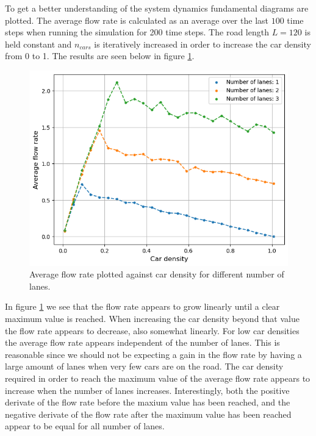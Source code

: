 \documentclass[a4paper,12pt]{article}
\begin{document}
To get a better understanding of the system dynamics fundamental diagrams are plotted. The average flow rate is calculated as an average over the last $100$ time steps when running
the simulation for 200 time steps. The road length $L=120$ is held constant and $n_{cars}$ is iteratively
increased in order to increase the car density from 0 to 1. The results are seen below in figure \ref*{fundamental diagram}.

\begin{figure}[H]
    \centering
    \includegraphics[scale=0.9]{Images/fundamental diagram 120.png}
    \caption{Average flow rate plotted against car density for different number of lanes.}
    \label{fundamental diagram}
\end{figure}

In figure \ref*{fundamental diagram} we see that the flow rate appears to grow linearly until a clear maximum value is reached. When increasing the car density beyond
that value the flow rate appears to decrease, also somewhat linearly. For low car densities the average flow rate appears independent of the number of lanes.
This is reasonable since we should not be expecting a gain in the flow rate by having a large amount of lanes when very few cars are on the road.
The car density required in order to reach the maximum value of the average flow rate appears to increase when the number of lanes increases. Interestingly, both the positive derivate
of the flow rate before the maxium value has been reached, and the negative derivate of the flow rate after the maximum value has been reached appear to be equal for all
number of lanes. 
\end{document}
